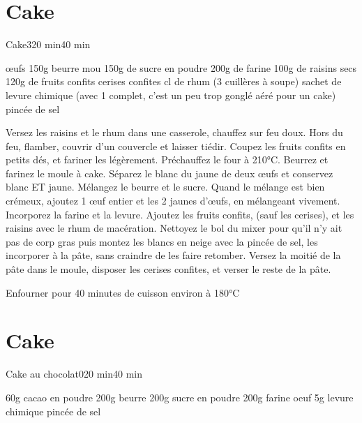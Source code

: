 {\section{Cake}
\begin{recette}{Cake}{3}{20 min}{40 min}
\begin{ingredients}
 œufs
\ingredient 150g beurre mou
\ingredient 150g de sucre en poudre
\ingredient 200g de farine
\ingredient 100g de raisins secs
\ingredient 120g de fruits confits
\ingredient cerises confites
 cl de rhum (3 cuillères à soupe)
 sachet de levure chimique (avec 1 complet, c'est un peu trop gonglé aéré pour un cake)
 pincée de sel
\end{ingredients}

\begin{preparation}
\etape Versez les raisins et le rhum dans une casserole, chauffez sur feu doux. Hors du feu, flamber, couvrir d'un couvercle et 
laisser tiédir.
\etape Coupez les fruits confits en petits dés, et fariner les légèrement.
\etape Préchauffez le four à 210°C. Beurrez et farinez le moule à cake.
\etape Séparez le blanc du jaune de deux œufs et conservez blanc ET jaune.
\etape Mélangez le beurre et le sucre. 
\etape Quand le mélange est bien crémeux, ajoutez 1 œuf entier et les 2 jaunes d'œufs, en 
mélangeant vivement.
\etape Incorporez la farine et la levure.
\etape Ajoutez les fruits confits, (sauf les cerises), et les raisins avec le rhum de macération.
\etape Nettoyez le bol du mixer pour qu'il n'y ait pas de corp gras puis montez les blancs en neige avec la pincée de sel, les 
incorporer à la pâte, sans craindre de les faire retomber.
\etape Versez la moitié de la pâte dans le moule, disposer les cerises confites, et verser le reste de la pâte.

\end{preparation}

\begin{cuisson}
Enfourner pour 40 minutes de cuisson environ à 180°C
\end{cuisson}
\end{recette}


\section{Cake}
\begin{recette}{Cake au chocolat}{0}{20 min}{40 min}
\begin{ingredients}
\ingredient 60g cacao en poudre
\ingredient 200g beurre
\ingredient 200g sucre en poudre
\ingredient 200g farine
 oeuf
\ingredient 5g levure chimique
 pincée de sel
\end{ingredients}


\end{recette}}
